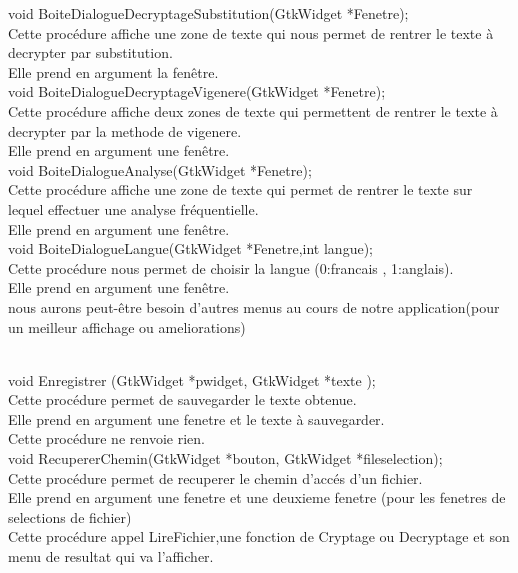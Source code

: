 \documentclass[a4]{article}
\begin{document}
	void BoiteDialogueDecryptageSubstitution(GtkWidget *Fenetre);\\
		Cette procédure affiche une zone de texte qui nous permet de rentrer le texte à decrypter par substitution.\\
		Elle prend en argument la fenêtre.\\
	
	void BoiteDialogueDecryptageVigenere(GtkWidget *Fenetre);\\
		Cette procédure affiche deux zones de texte qui permettent de rentrer le texte à decrypter par la methode de vigenere.\\
		Elle prend en argument une fenêtre.\\
		
	void BoiteDialogueAnalyse(GtkWidget *Fenetre);\\
		Cette procédure affiche une zone de texte qui permet de rentrer le texte sur lequel effectuer une analyse fréquentielle.\\
		Elle prend en argument une fenêtre.\\
		
	void BoiteDialogueLangue(GtkWidget *Fenetre,int langue);\\
		Cette procédure nous permet de choisir la langue (0:francais , 1:anglais).\\
		Elle prend en argument une fenêtre.\\
		
	nous aurons peut-être besoin d'autres menus au cours de notre application(pour un meilleur affichage ou ameliorations) 
	
	\\
	
	void Enregistrer (GtkWidget *pwidget, GtkWidget *texte );\\
		Cette procédure permet de sauvegarder le texte obtenue.\\
		Elle prend en argument une fenetre et le texte à sauvegarder.\\
		Cette procédure ne renvoie rien.\\
	
	void RecupererChemin(GtkWidget *bouton, GtkWidget *fileselection);\\
		Cette procédure permet de recuperer le chemin d'accés d'un fichier.\\
		Elle prend en argument une fenetre et une deuxieme fenetre (pour les fenetres de selections de fichier)\\
		Cette procédure appel LireFichier,une fonction de Cryptage ou Decryptage et son menu de resultat qui va l'afficher.\\
		
\end{document}
